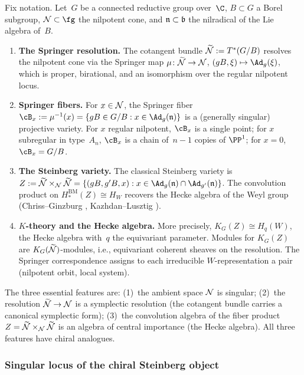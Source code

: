 Fix notation. Let~$G$ be a connected reductive group over~$\C$,
$B \subset G$ a Borel subgroup, $\cN \subset \fg$ the nilpotent
cone, and $\mathfrak{n} \subset \mathfrak{b}$ the nilradical of the Lie algebra of~$B$.

\begin{enumerate}[label=(\roman*),leftmargin=2em]
\item \textbf{The Springer resolution.}
 The cotangent bundle $\widetilde{\mathcal{N}} := T^*(G/B)$ resolves the
 nilpotent cone via the Springer map
 $\mu \colon \widetilde{\mathcal{N}} \to \mathcal{N}$,
 $(gB, \xi) \mapsto \Ad_g(\xi)$,
 which is proper, birational, and an isomorphism over the regular
 nilpotent locus.

\item \textbf{Springer fibers.}
 For $x \in \mathcal{N}$, the Springer fiber
 $\cB_x := \mu^{-1}(x) = \{gB \in G/B : x \in \Ad_g(\fn)\}$
 is a (generally singular) projective variety. For $x$ regular
 nilpotent, $\cB_x$ is a single point; for $x$ subregular in type~$A_n$,
 $\cB_x$ is a chain of~$n-1$ copies of $\PP^1$; for $x = 0$,
 $\cB_x = G/B$.

\item \textbf{The Steinberg variety.}
 The classical Steinberg variety is
 $Z := \widetilde{\cN} \times_{\cN} \widetilde{\cN}
 = \{(gB, g'B, x) : x \in \Ad_g(\fn) \cap \Ad_{g'}(\fn)\}$.
 The convolution product on
 $H_*^{\mathrm{BM}}(Z) \cong H_W$
 recovers the Hecke algebra of the Weyl group (Chriss--Ginzburg
 \cite{ChrissGinzburg}, Kazhdan--Lusztig \cite{KL80}).

\item \textbf{$K$-theory and the Hecke algebra.}
 More precisely, $K_G(Z) \cong H_q(W)$,
 the Hecke algebra with~$q$ the equivariant parameter. Modules for
 $K_G(Z)$ are $K_G(\widetilde{\mathcal{N}})$-modules, i.e., equivariant
 coherent sheaves on the resolution. The Springer correspondence
 assigns to each irreducible $W$-representation a pair (nilpotent
 orbit, local system).
\end{enumerate}

The three essential features are: (1)~the ambient space $\mathcal{N}$ is
singular; (2)~the resolution $\widetilde{\mathcal{N}} \to \mathcal{N}$ is a
symplectic resolution (the cotangent bundle carries a canonical
symplectic form); (3)~the convolution algebra of the fiber product
$Z = \widetilde{\mathcal{N}} \times_{\mathcal{N}} \widetilde{\mathcal{N}}$ is an algebra of
central importance (the Hecke algebra). All three features have
chiral analogues.

\subsubsection{Singular locus of the chiral Steinberg object}
\label{sssec:singular-locus}

